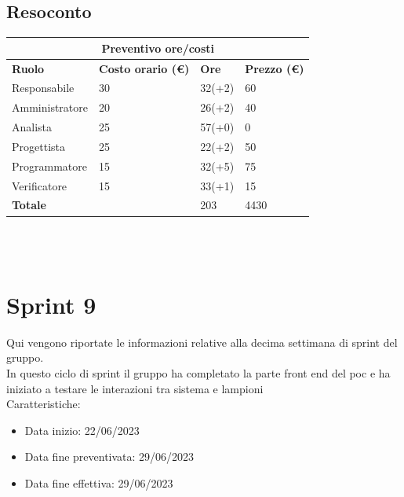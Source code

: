 \documentclass[12pt]{article}
\begin{document}
\subsection{Resoconto}
\begin{center}
    \begin{tabularx}{\textwidth}{|X|X|X|X|}
        \hline
        \multicolumn{4}{|c|}{\textbf{Preventivo ore/costi}}\\
        \hline
        \hline
        \textbf{Ruolo} & \textbf{Costo orario (\euro)} & \textbf{Ore} & \textbf{Prezzo (\euro)}\\
        \hline
        Responsabile    & 30 & 32(+2)  & 60\\
        \hline
        Amministratore  & 20 & 26(+2)  & 40\\
        \hline
        Analista        & 25 & 57(+0)  & 0\\
        \hline
        Progettista     & 25 & 22(+2)  & 50\\
        \hline
        Programmatore   & 15 & 32(+5)  & 75\\
        \hline
        Verificatore    & 15 & 33(+1)  & 15\\
        \hline
        \hline
        \textbf{Totale} &    & 203 &  4430 \\
        \hline
    \end{tabularx}\\[8pt]
    \mbox{}\\
\end{center}


\section{Sprint 9}
Qui vengono riportate le informazioni relative alla decima settimana di sprint del gruppo. \\
In questo ciclo di sprint il gruppo ha completato la parte front end del poc e ha iniziato a testare le interazioni tra sistema e lampioni \\


Caratteristiche:

\begin{itemize}
    \item Data inizio: 22/06/2023
    \item Data fine preventivata: 29/06/2023
    \item Data fine effettiva: 29/06/2023
\end{itemize}
\end{document}
